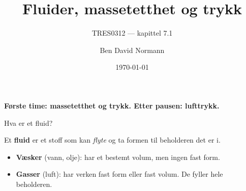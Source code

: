 \documentclass[aspectratio=169, 12pt]{beamer}
\title{Fluider, massetetthet og trykk}
\subtitle{TRES0312 --- kapittel 7.1}
\author{Ben David Normann}
\date{\today}
\begin{document}
\begin{frame}[plain]
  \titlepage
  \vspace{0.3cm}
  \begin{center}
  {\bfseries\color{repcol} Første time: massetetthet og trykk. Etter pausen: lufttrykk.}
  \end{center}
\end{frame}

\begin{frame}{}


\end{frame}


\begin{frame}{Hva er et fluid?}

  Et \textbf{fluid} er et stoff som kan \textit{flyte} og ta formen til beholderen det er i.
  \begin{itemize}
    \item \textbf{Væsker} (vann, olje): har et bestemt volum, men ingen fast form.
    \item \textbf{Gasser} (luft): har verken fast form eller fast volum. De fyller hele beholderen.
  \end{itemize}

\end{frame}
\end{document}
